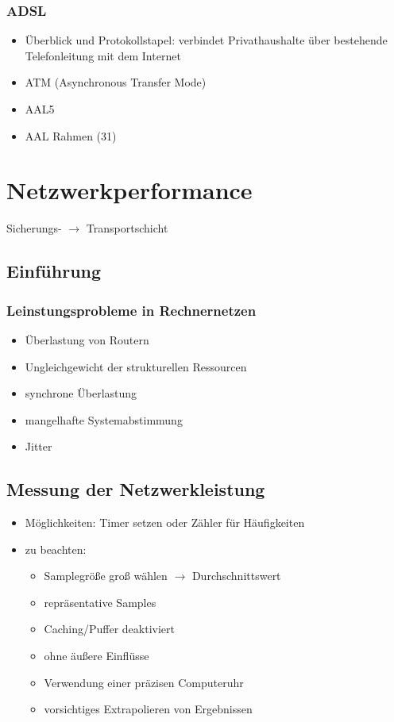 \subsubsection{ADSL}
\begin{itemize}
\item Überblick und Protokollstapel: verbindet Privathaushalte über bestehende Telefonleitung mit dem Internet
\item ATM (Asynchronous Transfer Mode)
\item AAL5
\item AAL Rahmen (31)
\end{itemize}

\section{}

\section{}

\section{Netzwerkperformance}
Sicherungs- $\to$ Transportschicht
\subsection{Einführung}
\subsubsection{Leinstungsprobleme in Rechnernetzen}
\begin{itemize}
	\item Überlastung von Routern
	\item Ungleichgewicht der strukturellen Ressourcen
	\item synchrone Überlastung
	\item mangelhafte Systemabstimmung
	\item Jitter
\end{itemize}
\subsection{Messung der Netzwerkleistung}
\begin{itemize}
	\item Möglichkeiten: Timer setzen oder Zähler für Häufigkeiten
	\item zu beachten:
	\begin{itemize}
		\item Samplegröße groß wählen $\to$ Durchschnittswert
		\item repräsentative Samples
		\item Caching/Puffer deaktiviert
		\item ohne äußere Einflüsse
		\item Verwendung einer präzisen Computeruhr
		\item vorsichtiges Extrapolieren von Ergebnissen
	\end{itemize}
\end{itemize}
